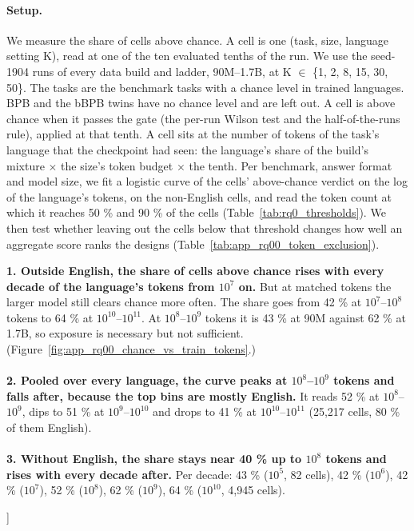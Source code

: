 {\begin{minipage}[t]{0.485\textwidth}
\paragraph{Setup.} We measure the share of cells above chance. A cell is one (task, size, language setting K), read at one of the ten evaluated tenths of the run. We use the seed-1904 runs of every data build and ladder, 90M--1.7B, at K $\in$ \{1, 2, 8, 15, 30, 50\}. The tasks are the benchmark tasks with a chance level in trained languages. BPB and the bBPB twins have no chance level and are left out. A cell is above chance when it passes the gate (the per-run Wilson test and the half-of-the-runs rule), applied at that tenth. A cell sits at the number of tokens of the task's language that the checkpoint had seen: the language's share of the build's mixture $\times$ the size's token budget $\times$ the tenth. Per benchmark, answer format and model size, we fit a logistic curve of the cells' above-chance verdict on the log of the language's tokens, on the non-English cells, and read the token count at which it reaches 50 \% and 90 \% of the cells (Table~\ref{tab:rq0_thresholds}). We then test whether leaving out the cells below that threshold changes how well an aggregate score ranks the designs (Table~\ref{tab:app_rq00_token_exclusion}).
\end{minipage}\hfill
\begin{minipage}[t]{0.485\textwidth}
\vspace{0pt}
\begin{rqfinding}
\textbf{1. Outside English, the share of cells above chance rises with every decade of the language's tokens from $10^{7}$ on.} But at matched tokens the larger model still clears chance more often. The share goes from 42 \% at $10^{7}$--$10^{8}$ tokens to 64 \% at $10^{10}$--$10^{11}$. At $10^{8}$--$10^{9}$ tokens it is 43 \% at 90M against 62 \% at 1.7B, so exposure is necessary but not sufficient. (Figure~\ref{fig:app_rq00_chance_vs_train_tokens}.)
\\
\\
\textbf{2. Pooled over every language, the curve peaks at $10^{8}$--$10^{9}$ tokens and falls after, because the top bins are mostly English.} It reads 52 \% at $10^{8}$--$10^{9}$, dips to 51 \% at $10^{9}$--$10^{10}$ and drops to 41 \% at $10^{10}$--$10^{11}$ (25,217 cells, 80 \% of them English).
\\
\\
\textbf{3. Without English, the share stays near 40 \% up to $10^{8}$ tokens and rises with every decade after.} Per decade: 43 \% ($10^{5}$, 82 cells), 42 \% ($10^{6}$), 42 \% ($10^{7}$), 52 \% ($10^{8}$), 62 \% ($10^{9}$), 64 \% ($10^{10}$, 4,945 cells).
\end{rqfinding}
\end{minipage}
\vspace{\baselineskip}
}]

